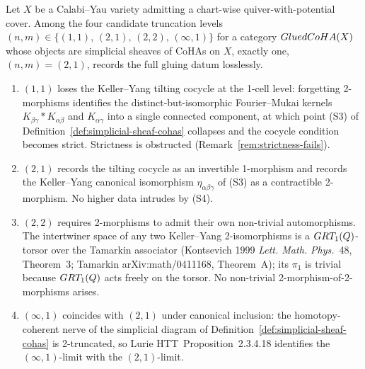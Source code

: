 \begin{proposition}
\label{prop:glcoha-truncation-forced}
\ClaimStatusProposition
Let $X$ be a Calabi--Yau variety admitting a chart-wise
quiver-with-potential cover. Among the four candidate truncation
levels $(n, m) \in \{(1,1),\, (2,1),\, (2,2),\, (\infty, 1)\}$ for a
category $GluedCoHA(X)$ whose objects are simplicial sheaves of CoHAs
on $X$, exactly one, $(n, m) = (2, 1)$, records the full gluing
datum losslessly.
\begin{enumerate}
\item[(i)] $(1,1)$ loses the Keller--Yang tilting cocycle at the
  1-cell level: forgetting 2-morphisms identifies the
  distinct-but-isomorphic Fourier--Mukai kernels
  $K_{\beta\gamma} \ast K_{\alpha\beta}$ and $K_{\alpha\gamma}$ into
  a single connected component, at which point (S3) of
  Definition~\ref{def:simplicial-sheaf-cohas} collapses and the
  cocycle condition becomes strict. Strictness is obstructed
  (Remark~\ref{rem:strictness-fails}).
\item[(ii)] $(2,1)$ records the tilting cocycle as an
  invertible 1-morphism and records the Keller--Yang canonical
  isomorphism $\eta_{\alpha\beta\gamma}$ of (S3) as a contractible
  2-morphism. No higher data intrudes by (S4).
\item[(iii)] $(2,2)$ requires 2-morphisms to admit their own
  non-trivial automorphisms. The intertwiner space of any two
  Keller--Yang 2-isomorphisms is a $GRT_1(Q)$-torsor
  over the Tamarkin associator (Kontsevich 1999
  \emph{Lett. Math. Phys.}~48, Theorem~3;
  Tamarkin arXiv:math/0411168, Theorem~A); its $\pi_1$ is trivial
  because $GRT_1(Q)$ acts freely on the torsor. No
  non-trivial 2-morphism-of-2-morphisms arises.
\item[(iv)] $(\infty, 1)$ coincides with $(2, 1)$ under canonical
  inclusion: the homotopy-coherent nerve of the simplicial diagram
  of Definition~\ref{def:simplicial-sheaf-cohas} is 2-truncated, so
  Lurie HTT~Proposition~2.3.4.18 identifies the $(\infty, 1)$-limit
  with the $(2, 1)$-limit.
\end{enumerate}
\end{proposition}

